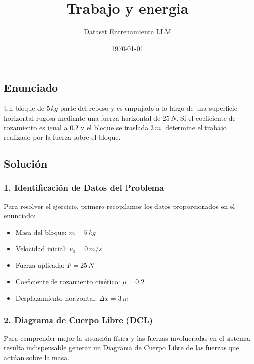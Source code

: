 \documentclass[12pt, a4paper]{article}
\title{Trabajo y energia}
\author{Dataset Entrenamiento LLM}
\date{\today}
\begin{document}
\subsection*{Enunciado}
Un bloque de $5 \, \si{kg}$ parte del reposo y es empujado a lo largo de una superficie horizontal rugosa mediante una fuerza horizontal de $25 \, \si{N}$. Si el coeficiente de rozamiento es igual a $0.2$ y el bloque se traslada $3 \, \si{m}$, determine el trabajo realizado por la fuerza sobre el bloque.

\begin{center}
\end{center}

\subsection*{Solución}

\subsubsection*{1. Identificación de Datos del Problema}
Para resolver el ejercicio, primero recopilamos los datos proporcionados en el enunciado:
\begin{itemize}
    \item Masa del bloque: $m = 5 \, \si{kg}$
    \item Velocidad inicial: $v_0 = 0 \, \si{m/s}$
    \item Fuerza aplicada: $F = 25 \, \si{N}$
    \item Coeficiente de rozamiento cinético: $\mu = 0.2$
    \item Desplazamiento horizontal: $\Delta x = 3 \, \si{m}$
\end{itemize}

\subsubsection*{2. Diagrama de Cuerpo Libre (DCL)}
Para comprender mejor la situación física y las fuerzas involucradas en el sistema, resulta indispensable generar un Diagrama de Cuerpo Libre de las fuerzas que actúan sobre la masa.
\end{document}
